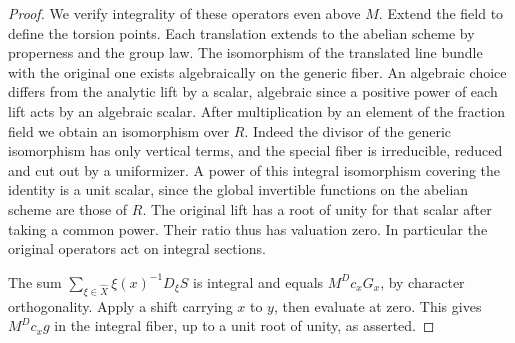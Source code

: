 \documentclass[a4paper,11pt]{article}
\theoremstyle{definition}
\theoremstyle{remark}
\numberwithin{equation}{section}
\begin{document}
\begin{proof}
We verify integrality of these operators even above \(M\).
Extend the field to define the torsion points. Each translation
extends to the abelian scheme by properness and the group law.
The isomorphism of the translated line bundle with the original
one exists algebraically on the generic fiber. An algebraic
choice differs from the analytic lift by a scalar, algebraic
since a positive power of each lift acts by an algebraic scalar.
After multiplication by an element of the fraction field we
obtain an isomorphism over \(R\). Indeed the divisor of the
generic isomorphism has only vertical terms, and the special
fiber is irreducible, reduced and cut out by a uniformizer.
A power of this integral isomorphism covering the identity
is a unit scalar, since the global invertible functions on
the abelian scheme are those of \(R\). The original lift has
a root of unity for that scalar after taking a common power.
Their ratio thus has valuation zero. In particular the original
operators act on integral sections.

The sum \(\sum_{\xi\in\widehat X}\xi(x)^{-1}D_\xi S\) is
integral and equals \(M^D c_xG_x\), by character orthogonality.
Apply a shift carrying \(x\) to \(y\), then evaluate at zero.
This gives \(M^Dc_xg\) in the integral fiber, up to a unit
root of unity, as asserted.
\end{proof}
\end{document}
